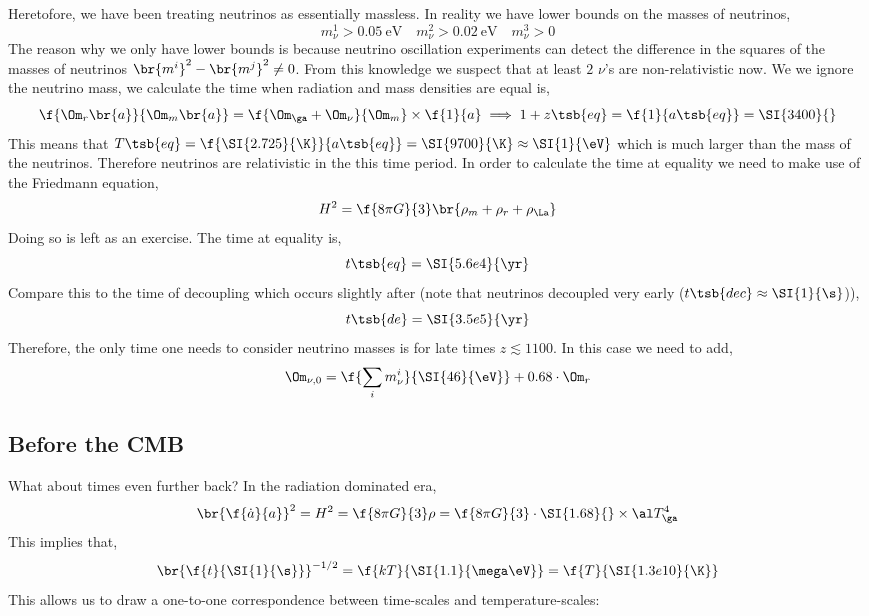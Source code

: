 \documentclass{article}
\begin{document}
Heretofore, we have been treating neutrinos as essentially massless. In reality we have lower bounds on the masses of neutrinos,
\[ m_\nu^1 > \SI{0.05}{\eV} \quad m_\nu^2 > \SI{0.02}{\eV} \quad m_\nu^3 > 0 \]
The reason why we only have lower bounds is because neutrino oscillation experiments can detect the difference in the squares of the masses of neutrinos $\br{m^i}^2 - \br{m^j}^2 \neq 0$. From this knowledge we suspect that at least $2$ $\nu$'s are non-relativistic now. We we ignore the neutrino mass, we calculate the time when radiation and mass densities are equal is,
\[ \f{\Om_r\br{a}}{\Om_m\br{a}} = \f{\Om_\ga + \Om_\nu}{\Om_m} \times \f{1}{a} \implies 1 + z\tsb{eq} = \f{1}{a\tsb{eq}} = \SI{3400}{} \]
This means that $T\tsb{eq} = \f{\SI{2.725}{\K}}{a\tsb{eq}} = \SI{9700}{\K} \approx \SI{1}{\eV}$ which is much larger than the mass of the neutrinos. Therefore neutrinos are relativistic in the this time period.
In order to calculate the time at equality we need to make use of the Friedmann equation,
\[ H^2 = \f{8\pi G}{3}\br{\rho_m + \rho_r + \rho_\La} \]
Doing so is left as an exercise. The time at equality is,
\[ t\tsb{eq} = \SI{5.6e4}{\yr} \]
Compare this to the time of decoupling which occurs slightly after (note that neutrinos decoupled very early ($t\tsb{dec} \approx \SI{1}{\s}$)),
\[ t\tsb{de} = \SI{3.5e5}{\yr} \]
Therefore, the only time one needs to consider neutrino masses is for late times $z \lesssim 1100$.  In this case we need to add,
\[ \Om_{\nu, 0} = \f{\sum_i m_\nu^i}{\SI{46}{\eV}} + 0.68 \cdot \Om_{r} \]

\subsection{Before the CMB}
What about times even further back? In the radiation dominated era,
\[ \br{\f{\dot a}{a}}^2 = H^2 = \f{8 \pi G}{3} \rho = \f{8 \pi G}{3} \cdot \SI{1.68}{} \times \al T_\ga^4 \]
This implies that,
\[ \br{\f{t}{\SI{1}{\s}}}^{-1/2} = \f{k T}{\SI{1.1}{\mega \eV}} = \f{T}{\SI{1.3e10}{\K}}  \]
This allows us to draw a one-to-one correspondence between time-scales and temperature-scales:
\end{document}
